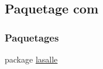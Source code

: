 \hypertarget{namespacecom}{}\subsection{Paquetage com}
\label{namespacecom}
\subsubsection*{Paquetages}
\begin{DoxyCompactItemize}
\item 
package \hyperlink{namespacecom_1_1lasalle}{lasalle}
\end{DoxyCompactItemize}

